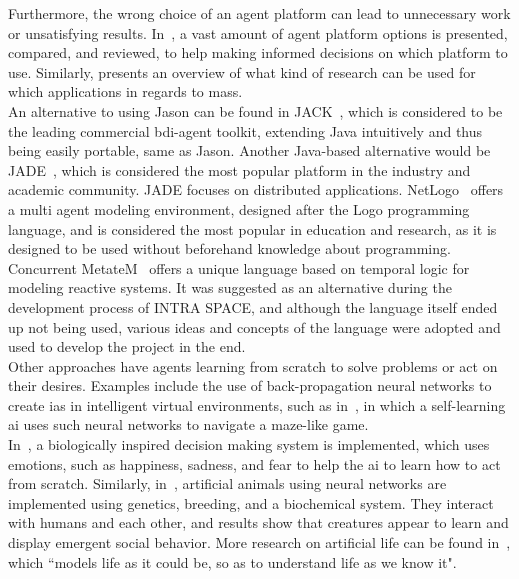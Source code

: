 \documentclass[draft,final]{vutinfth} %
\begin{document}
Furthermore, the wrong choice of an agent platform can lead to unnecessary work or unsatisfying results. 
In~\cite{kravari2015survey}, a vast amount of agent platform options is presented, compared, and reviewed, to help making informed decisions on which platform to use. 
Similarly, \cite{oliveira1999multi} presents an overview of what kind of research can be used for which applications in regards to \glspl{mas}. \\
An alternative to using Jason can be found in JACK~\cite{Winikoff2005}, which is considered to be the leading commercial \gls{bdi}-agent toolkit, extending Java intuitively and thus being easily portable, same as Jason. 
Another Java-based alternative would be JADE~\cite{bellifemine1999jade}, which is considered the most popular platform in the industry and academic community. 
JADE focuses on distributed applications. 
NetLogo~\cite{tisue2004netlogo} offers a multi agent modeling environment, designed after the Logo programming language, and is considered the most popular in education and research, as it is designed to be used without beforehand knowledge about programming. \\
Concurrent MetateM~\cite{Barringer1995} offers a unique language based on temporal logic for modeling reactive systems. 
It was suggested as an alternative during the development process of INTRA SPACE, and although the language itself ended up not being used, various ideas and concepts of the language were adopted and used to develop the project in the end. \\
Other approaches have agents learning from scratch to solve problems or act on their desires.
Examples include the use of back-propagation neural networks to create \glspl{ia} in intelligent virtual environments, such as in~\cite{jia2007entertainment}, in which a self-learning \gls{ai} uses such neural networks to navigate a maze-like game. \\
In~\cite{salichs2012new}, a biologically inspired decision making system is implemented, which uses emotions, such as happiness, sadness, and fear to help the \gls{ai} to learn how to act from scratch.
Similarly, in~\cite{grand1998creatures}, artificial animals using neural networks are implemented using genetics, breeding, and a biochemical system. 
They interact with humans and each other, and results show that creatures appear to learn and display emergent social behavior. 
More research on artificial life can be found in~\cite{maes1995artificial}, which ``models life as it could be, so as to understand life as we know it".
\end{document}
